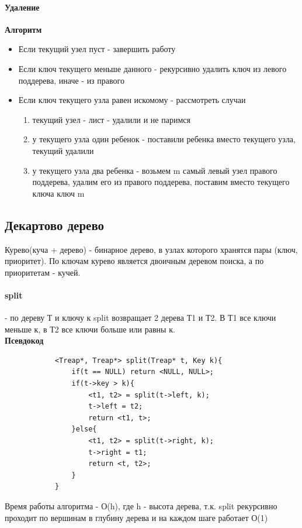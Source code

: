 \documentclass[a4paper,10pt]{article}
\begin{document}
\paragraph{Удаление}
\textbf{Алгоритм}
\begin{itemize}
	\item Если текущий узел пуст - завершить работу
	\item Если ключ текущего меньше данного - рекурсивно удалить ключ из левого поддерева, иначе - из правого
	\item Если ключ текущего узла равен искомому - рассмотреть случаи 
	\begin{enumerate}
		\item текущий узел - лист - удалили и не паримся
		\item у текущего узла один ребенок - поставили ребенка вместо текущего узла, текущий удалили
		\item у текущего узла два ребенка - возьмем m самый левый узел правого поддерева, удалим его из правого поддерева, поставим вместо текущего ключа ключ m
	\end{enumerate}
\end{itemize}
\subsection{Декартово дерево}
Курево(куча + дерево) - бинарное дерево, в узлах которого хранятся пары (ключ, приоритет). По ключам курево является двоичным деревом поиска, а по приоритетам - кучей.
\paragraph{split} - по дереву Т и ключу к split возвращает 2 дерева Т1 и Т2. В Т1 все ключи меньше к, в Т2 все ключи больше или равны к.\\
\textbf{Псевдокод}\\
\begin{center}
		\begin{lstlisting}
			<Treap*, Treap*> split(Treap* t, Key k){
				if(t == NULL) return <NULL, NULL>;
				if(t->key > k){
					<t1, t2> = split(t->left, k);
					t->left = t2;
					return <t1, t>;
				}else{
					<t1, t2> = split(t->right, k);
					t->right = t1;
					return <t, t2>;
				}
			}
		\end{lstlisting}
	\end{center}
Время работы алгоритма - О(h), где h - высота дерева, т.к. split рекурсивно проходит по вершинам в глубину дерева и на каждом шаге работает О(1)
\end{document}
